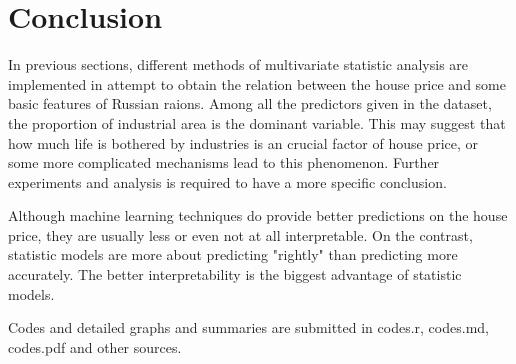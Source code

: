 \documentclass{article}
\begin{document}
\section{Conclusion}
In previous sections, different methods of multivariate statistic analysis are implemented in attempt to obtain the relation between the house price and some basic features of Russian raions. Among all the predictors given in the dataset, the proportion of industrial area is the dominant variable. This may suggest that how much life is bothered by industries is an crucial factor of house price, or some more complicated mechanisms lead to this phenomenon. Further experiments and analysis is required to have a more specific conclusion.

Although machine learning techniques do provide better predictions on the house price, they are usually less or even not at all interpretable. On the contrast, statistic models are more about predicting "rightly" than predicting more accurately. The better interpretability is the biggest advantage of statistic models.

\nocite{AMSA}
\nocite{MASS}
\nocite{forecast1}
\nocite{forecast2}




\appendix
Codes and detailed graphs and summaries are submitted in codes.r, codes.md, codes.pdf and other sources.
\end{document}
